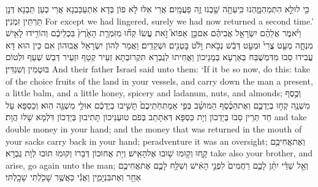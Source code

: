 {כִּ֖י לוּלֵ֣א הִתְמַהְמָ֑הְנוּ כִּֽי\maqqaf עַתָּ֥ה שַׁ֖בְנוּ זֶ֥ה פַעֲמָֽיִם׃}
{אֲרֵי אִלּוּ לָא פוֹן בְּדָא אִתְעַכַּבְנָא אֲרֵי כְעַן תַּבְנָא דְּנָן תַּרְתֵּין זִמְנִין׃}
{For except we had lingered, surely we had now returned a second time.’}{}
{וַיֹּ֨אמֶר אֲלֵהֶ֜ם יִשְׂרָאֵ֣ל אֲבִיהֶ֗ם אִם\maqqaf כֵּ֣ן \pasek  אֵפוֹא֮ זֹ֣את עֲשׂוּ֒ קְח֞וּ מִזִּמְרַ֤ת הָאָ֙רֶץ֙ בִּכְלֵיכֶ֔ם וְהוֹרִ֥ידוּ לָאִ֖ישׁ מִנְחָ֑ה מְעַ֤ט צֳרִי֙ וּמְעַ֣ט דְּבַ֔שׁ נְכֹ֣את וָלֹ֔ט בׇּטְנִ֖ים וּשְׁקֵדִֽים׃}
{וַאֲמַר לְהוֹן יִשְׂרָאֵל אֲבוּהוֹן אִם כֵּין הוּא דָּא עֲבִידוּ סַבוּ מִדִּמְשֻׁבַּח בְּאַרְעָא בְּמָנֵיכוֹן וַאֲחִיתוּ לְגֻבְרָא תִּקְרוּבְתָּא זְעֵיר קְטַף וּזְעֵיר דְּבַשׁ שְׁעַף וּלְטוֹם בּוּטְמִין וְשִׁגְדִּין׃}
{And their father Israel said unto them: ‘If it be so now, do this: take of the choice fruits of the land in your vessels, and carry down the man a present, a little balm, and a little honey, spicery and ladanum, nuts, and almonds;}{}
{וְכֶ֥סֶף מִשְׁנֶ֖ה קְח֣וּ בְיֶדְכֶ֑ם וְאֶת\maqqaf הַכֶּ֜סֶף הַמּוּשָׁ֨ב בְּפִ֤י אַמְתְּחֹֽתֵיכֶם֙ תָּשִׁ֣יבוּ בְיֶדְכֶ֔ם אוּלַ֥י מִשְׁגֶּ֖ה הֽוּא׃}
{וְכַסְפָּא עַל חַד תְּרֵין סַבוּ בְּיַדְכוֹן וְיָת כַּסְפָּא דְּאִתָּתַב בְּפֹם טוּעְנֵיכוֹן תָּתִיבוּן בְּיַדְכוֹן דִּלְמָא שָׁלוּ הֲוָת׃}
{and take double money in your hand; and the money that was returned in the mouth of your sacks carry back in your hand; peradventure it was an oversight;}{}
{וְאֶת\maqqaf אֲחִיכֶ֖ם קָ֑חוּ וְק֖וּמוּ שׁ֥וּבוּ אֶל\maqqaf הָאִֽישׁ׃}
{וְיָת אֲחוּכוֹן דְּבַרוּ וְקוּמוּ תּוּבוּ לְוָת גֻּבְרָא׃}
{take also your brother, and arise, go again unto the man;}{}
{וְאֵ֣ל שַׁדַּ֗י יִתֵּ֨ן לָכֶ֤ם רַחֲמִים֙ לִפְנֵ֣י הָאִ֔ישׁ וְשִׁלַּ֥ח לָכֶ֛ם אֶת\maqqaf אֲחִיכֶ֥ם אַחֵ֖ר וְאֶת\maqqaf בִּנְיָמִ֑ין וַאֲנִ֕י כַּאֲשֶׁ֥ר שָׁכֹ֖לְתִּי שָׁכָֽלְתִּי׃}
